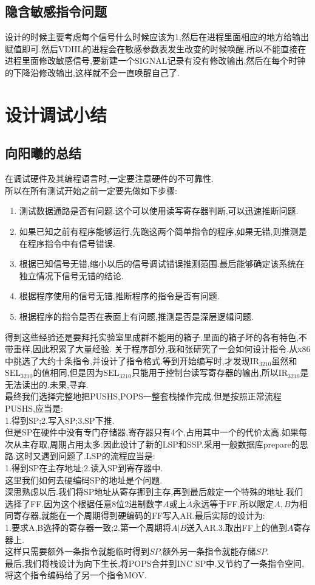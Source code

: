 \documentclass[UTF8]{ctexart}
\begin{document}
\subsection{隐含敏感指令问题}
设计的时候主要考虑每个信号什么时候应该为1,然后在进程里面相应的地方给输出赋值即可.然后VDHL的进程会在敏感参数表发生改变的时候唤醒.所以不能直接在进程里面修改敏感信号,要新建一个SIGNAL记录有没有修改输出,然后在每个时钟的下降沿修改输出,这样就不会一直唤醒自己了.
\newpage
\section{设计调试小结}
\subsection{向阳曦的总结}
在调试硬件及其编程语言时,一定要注意硬件的不可靠性.\\
\indent 所以在所有测试开始之前一定要先做如下步骤:
\begin{enumerate}
	\item 测试数据通路是否有问题.这个可以使用读写寄存器判断,可以迅速推断问题.
	\item 如果已知之前有程序能够运行,先跑这两个简单指令的程序,如果无错,则推测是在程序指令中有信号错误.
	\item 根据已知信号无错,缩小以后的信号调试错误推测范围.最后能够确定该系统在独立情况下信号无错的结论.
	\item 根据程序使用的信号无错,推断程序的指令是否有问题.
	\item 根据程序的指令是否在表面上有问题,推测是否是深层逻辑问题.
\end{enumerate}
\indent\indent 得到这些经验还是要拜托实验室里成群不能用的箱子.里面的箱子坏的各有特色,不带重样,因此积累了大量经验.
关于程序部分,我和张研究了一会如何设计指令.从x86中挑选了大约十条指令,并设计了指令格式.等到开始编写时,才发现$\text{IR}_{3210}$虽然和$\text{SEL}_{3210}$的值相同,但是因为$\text{SEL}_{3210}$只能用于控制台读写寄存器的输出,所以$\text{IR}_{3210}$是无法读出的.未果,寻弃.\\
\indent 最终我们选择完整地把PUSHS,POPS一整套栈操作完成.但是按照正常流程PUSHS,应当是:\\
\indent \indent 1.得到SP;2.写入SP;3.SP下推.
\\ 但是SP在硬件中没有专门存储器,寄存器只有4个,占用其中一个的代价太高.如果每次从主存取,周期占用太多.因此设计了新的LSP和SSP.采用一般数据库prepare的思路.这时又遇到问题了.LSP的流程应当是:\\
\indent \indent 1.得到SP在主存地址;2.读入SP到寄存器中.\\
\indent 这里我们如何去硬编码SP的地址是个问题.\\
\indent 深思熟虑以后.我们将SP地址从寄存挪到主存,再到最后敲定一个特殊的地址.我们选择了FF.因为这个根据任意8位2进制数字$A$或上$\overline{A}$永远等于FF.所以限定$A,B$为相同寄存器,就能在一个周期得到硬编码的FF写入AR.最后实际的设计为:\\
\indent \indent 1.要求A,B选择的寄存器一致;2.第一个周期将$A|\overline{B}$送入AR.3.取出FF上的值到$A$寄存器上.\\
\indent 这样只需要额外一条指令就能临时得到$SP$,额外另一条指令就能存储$SP$.\\
\indent 最后,我们将栈设计为向下生长,将POPS合并到INC SP中.又节约了一条指令空间,将这个指令编码给了另一个指令MOV.
\newpage
\end{document}
